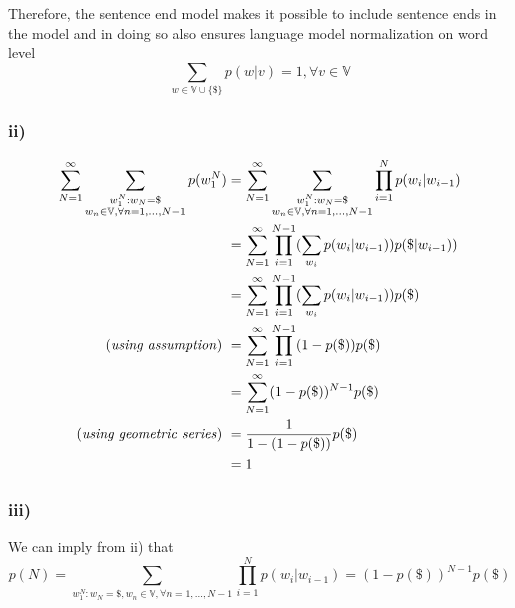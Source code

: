 Therefore, the sentence end model makes it possible to include sentence ends 
in the model and in doing so also ensures language model normalization on word 
level 
\[
	\sum_{w \in \mathbb{V} \cup \{\$\}} p(w|v) = 1, \forall v \in \mathbb{V}
\]

\subsubsection*{ii)}%
\label{ssub:ii_}


\begin{align*}
	\sum_{N=1}^{\infty}  \sum_{\substack{w_{1}^{N}: w_N = \$ \\ w_n \in \mathbb{V}, \forall n = 1,...,N-1}} p(w_1^{N}) &= \sum_{N=1}^{\infty}  \sum_{\substack{w_{1}^{N}: w_N = \$ \\ w_n \in \mathbb{V}, \forall n = 1,...,N-1}} \prod_{i = 1}^{N} p(w_i|w_{i-1})  \\
	 &= \sum_{N=1}^{\infty}  \prod_{i = 1}^{N-1} (\sum_{w_i} p(w_i|w_{i-1})) p(\$|w_{i-1}))  \\
	 &= \sum_{N=1}^{\infty}  \prod_{i = 1}^{N-1} (\sum_{w_i} p(w_i|w_{i-1})) p(\$)  \\
	\text{(\textit{using assumption}) }  &= \sum_{N=1}^{\infty}  \prod_{i = 1}^{N-1} (1-p(\$)) p(\$)  \\
	 &= \sum_{N=1}^{\infty}  (1-p(\$))^{N-1} p(\$)  \\
	\text{(\textit{using geometric series}) }	 &= \frac{1}{1 - (1 -p(\$))} p(\$)  \\
	 &= 1
\end{align*}

\subsubsection*{iii)}%
\label{ssub:iii_}

We can imply from ii) that 
\[
	p(N) = \sum_{w_{1}^{N}: w_N = \$, w_n \in \mathbb{V}, \forall n = 1,...,N-1} \prod_{i = 1}^{N} p(w_i|w_{i-1}) = (1-p(\$))^{N-1} p(\$) 
\]

